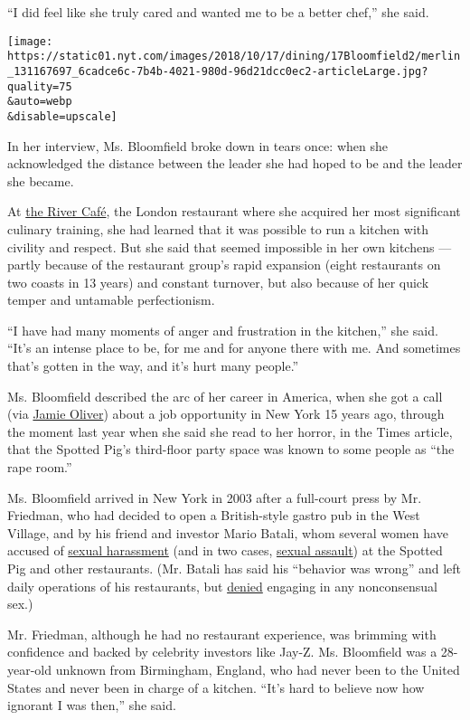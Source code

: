 ``I did feel like she truly cared and wanted me to be a better chef,''
she said.

\texttt{[image: https://static01.nyt.com/images/2018/10/17/dining/17Bloomfield2/merlin\_131167697\_6cadce6c-7b4b-4021-980d-96d21dcc0ec2-articleLarge.jpg?quality=75\\\&auto=webp\\\&disable=upscale]}

In her interview, Ms. Bloomfield broke down in tears once: when she
acknowledged the distance between the leader she had hoped to be and the
leader she became.

At \href{http://www.rivercafe.co.uk/}{the River Café}, the London
restaurant where she acquired her most significant culinary training,
she had learned that it was possible to run a kitchen with civility and
respect. But she said that seemed impossible in her own kitchens ---
partly because of the restaurant group's rapid expansion (eight
restaurants on two coasts in 13 years) and constant turnover, but also
because of her quick temper and untamable perfectionism.

``I have had many moments of anger and frustration in the kitchen,'' she
said. ``It's an intense place to be, for me and for anyone there with
me. And sometimes that's gotten in the way, and it's hurt many people.''

Ms. Bloomfield described the arc of her career in America, when she got
a call (via \href{https://www.jamieoliver.com/}{Jamie Oliver}) about a
job opportunity in New York 15 years ago, through the moment last year
when she said she read to her horror, in the Times article, that the
Spotted Pig's third-floor party space was known to some people as ``the
rape room.''

Ms. Bloomfield arrived in New York in 2003 after a full-court press by
Mr. Friedman, who had decided to open a British-style gastro pub in the
West Village, and by his friend and investor Mario Batali, whom several
women have accused of
\href{https://www.nytimes.com/2017/12/11/dining/mario-batali-sexual-misconduct.html}{sexual
harassment} (and in two cases,
\href{https://www.nytimes.com/2018/05/21/dining/mario-batali-sexual-assault.html}{sexual
assault}) at the Spotted Pig and other restaurants. (Mr. Batali has said
his ``behavior was wrong'' and left daily operations of his restaurants,
but
\href{https://www.nytimes.com/2018/05/21/dining/mario-batali-sexual-assault.html}{denied}
engaging in any nonconsensual sex.)

Mr. Friedman, although he had no restaurant experience, was brimming
with confidence and backed by celebrity investors like Jay-Z. Ms.
Bloomfield was a 28-year-old unknown from Birmingham, England, who had
never been to the United States and never been in charge of a kitchen.
``It's hard to believe now how ignorant I was then,'' she said.

